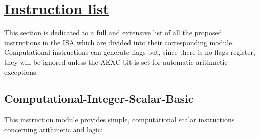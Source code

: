 \section[Instruction list]{\LARGE\underline{Instruction list}}

    \vspace{10pt}

    This section is dedicated to a full and extensive list of all the proposed instructions in the ISA which are divided into their corresponding module. Computational instructions can generate flags but, since there is no flags register, they will be ignored unless the AEXC bit is set for automatic arithmetic exceptions.

    \subsection{Computational-Integer-Scalar-Basic}

        This instruction module provides simple, computational scalar instructions concerning arithmetic and logic:

